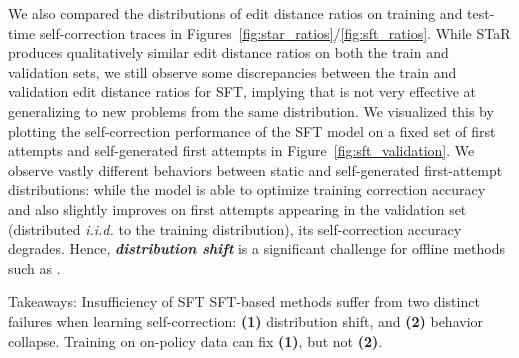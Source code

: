 We also compared the distributions of edit distance ratios on training and test-time self-correction traces in Figures~\ref{fig:star_ratios}/\ref{fig:sft_ratios}. While STaR produces qualitatively similar edit distance ratios on both the train and validation sets, we still observe some discrepancies between the train and validation edit distance ratios for SFT, implying that \pairsft{} is not very effective at generalizing to new problems from the same distribution. We visualized this by plotting the self-correction performance of the SFT model on a fixed set of first attempts and self-generated first attempts in Figure~\ref{fig:sft_validation}. We observe vastly different behaviors between static and self-generated first-attempt distributions: while the model is able to optimize training correction accuracy and also slightly improves on first attempts appearing in the validation set (distributed \emph{i.i.d.} to the training distribution), its self-correction accuracy degrades. Hence, \emph{\textbf{distribution shift}} is a significant challenge for offline methods such as \pairsft{}.

\begin{AIbox}{Takeaways: Insufficiency of SFT}
SFT-based methods suffer from two distinct failures when learning self-correction: \textbf{(1)} distribution shift, and \textbf{(2)} behavior collapse. Training on on-policy data can fix \textbf{(1)}, but not \textbf{(2)}. 
\end{AIbox}








